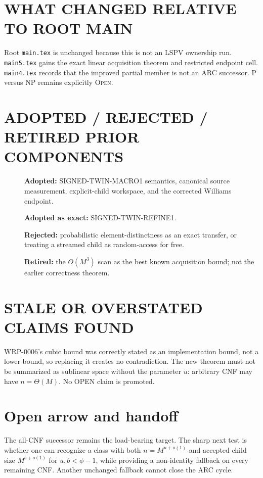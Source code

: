 \documentclass[11pt]{article}
\begin{document}
\section{WHAT CHANGED RELATIVE TO ROOT MAIN}
Root \texttt{main.tex} is unchanged because this is not an LSPV ownership
run.  \texttt{main5.tex} gains the exact linear acquisition theorem and
restricted endpoint cell.  \texttt{main4.tex} records that the improved
partial member is not an ARC successor.  P versus NP remains explicitly
\textsc{Open}.

\section{ADOPTED / REJECTED / RETIRED PRIOR COMPONENTS}
\begin{description}
\item[] \textbf{Adopted:} SIGNED-TWIN-MACRO1 semantics, canonical source
measurement, explicit-child workspace, and the corrected Williams endpoint.
\item[] \textbf{Adopted as exact:} SIGNED-TWIN-REFINE1.
\item[] \textbf{Rejected:} probabilistic element-distinctness as an exact
transfer, or treating a streamed child as random-access for free.
\item[] \textbf{Retired:} the $O(M^3)$ scan as the best known acquisition
bound; not the earlier correctness theorem.
\end{description}

\section{STALE OR OVERSTATED CLAIMS FOUND}
WRP-0006's cubic bound was correctly stated as an implementation bound, not a
lower bound, so replacing it creates no contradiction.  The new theorem must
not be summarized as sublinear space without the parameter $u$: arbitrary
CNF may have $n=\Theta(M)$.  No OPEN claim is promoted.

\section{Open arrow and handoff}
The all-CNF successor remains the load-bearing target.  The sharp next test is
whether one can recognize a class with both $n=M^{u+o(1)}$ and accepted child
size $M^{b+o(1)}$ for $u,b<\phi-1$, while providing a non-identity fallback
on every remaining CNF.  Another unchanged fallback cannot close the ARC
cycle.



\end{document}
